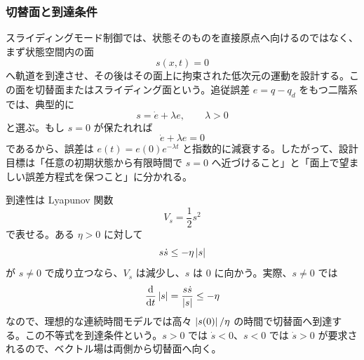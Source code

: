\subsubsection{切替面と到達条件}

スライディングモード制御では、状態そのものを直接原点へ向けるのではなく、まず状態空間内の面
\begin{equation}
  s(x,t)=0
\end{equation}
へ軌道を到達させ、その後はその面上に拘束された低次元の運動を設計する。この面を切替面またはスライディング面という。追従誤差 $e=q-q_d$ をもつ二階系では、典型的に
\begin{equation}
  s=\dot{e}+\lambda e,\qquad \lambda>0
\end{equation}
と選ぶ。もし $s=0$ が保たれれば
\begin{equation}
  \dot{e}+\lambda e=0
\end{equation}
であるから、誤差は $e(t)=e(0)e^{-\lambda t}$ と指数的に減衰する。したがって、設計目標は「任意の初期状態から有限時間で $s=0$ へ近づけること」と「面上で望ましい誤差方程式を保つこと」に分かれる。

到達性は Lyapunov 関数
\begin{equation}
  V_s=\frac{1}{2}s^2
\end{equation}
で表せる。ある $\eta>0$ に対して
\begin{equation}
  s\dot{s}\le -\eta\left|s\right|
\end{equation}
が $s\ne0$ で成り立つなら、$V_s$ は減少し、$s$ は 0 に向かう。実際、$s\ne0$ では
\begin{equation}
  \frac{\mathrm{d}}{\mathrm{d} t}\left|s\right|
  =
  \frac{s\dot{s}}{\left|s\right|}
  \le -\eta
\end{equation}
なので、理想的な連続時間モデルでは高々 $\left|s(0)\right|/\eta$ の時間で切替面へ到達する。この不等式を到達条件という。$s>0$ では $\dot{s}<0$、$s<0$ では $\dot{s}>0$ が要求されるので、ベクトル場は両側から切替面へ向く。

